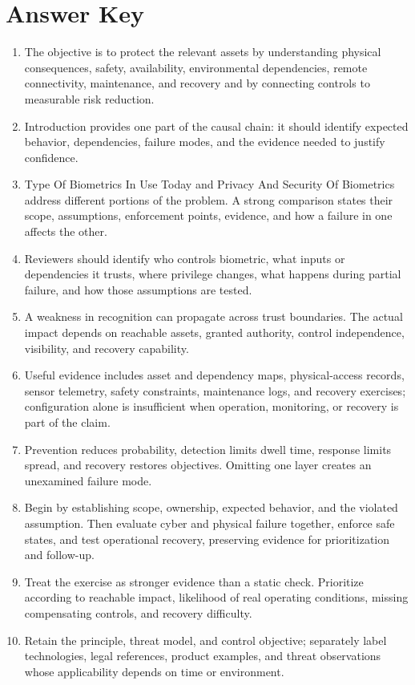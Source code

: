 \documentclass[11pt]{article}
\begin{document}
\section*{Answer Key}
\begin{enumerate}
\item The objective is to protect the relevant assets by understanding physical consequences, safety, availability, environmental dependencies, remote connectivity, maintenance, and recovery and by connecting controls to measurable risk reduction.
\item Introduction provides one part of the causal chain: it should identify expected behavior, dependencies, failure modes, and the evidence needed to justify confidence.
\item Type Of Biometrics In Use Today and Privacy And Security Of Biometrics address different portions of the problem. A strong comparison states their scope, assumptions, enforcement points, evidence, and how a failure in one affects the other.
\item Reviewers should identify who controls biometric, what inputs or dependencies it trusts, where privilege changes, what happens during partial failure, and how those assumptions are tested.
\item A weakness in recognition can propagate across trust boundaries. The actual impact depends on reachable assets, granted authority, control independence, visibility, and recovery capability.
\item Useful evidence includes asset and dependency maps, physical-access records, sensor telemetry, safety constraints, maintenance logs, and recovery exercises; configuration alone is insufficient when operation, monitoring, or recovery is part of the claim.
\item Prevention reduces probability, detection limits dwell time, response limits spread, and recovery restores objectives. Omitting one layer creates an unexamined failure mode.
\item Begin by establishing scope, ownership, expected behavior, and the violated assumption. Then evaluate cyber and physical failure together, enforce safe states, and test operational recovery, preserving evidence for prioritization and follow-up.
\item Treat the exercise as stronger evidence than a static check. Prioritize according to reachable impact, likelihood of real operating conditions, missing compensating controls, and recovery difficulty.
\item Retain the principle, threat model, and control objective; separately label technologies, legal references, product examples, and threat observations whose applicability depends on time or environment.
\end{enumerate}
\end{document}
